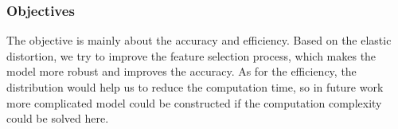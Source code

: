 \subsubsection{Objectives}
The objective is mainly about the accuracy and efficiency. Based on the elastic distortion, we try to improve the feature selection process, which makes the model more robust and improves the accuracy. As for the efficiency, the distribution would help us to reduce the computation time, so in future work more complicated model could be constructed if the computation complexity could be solved here.








